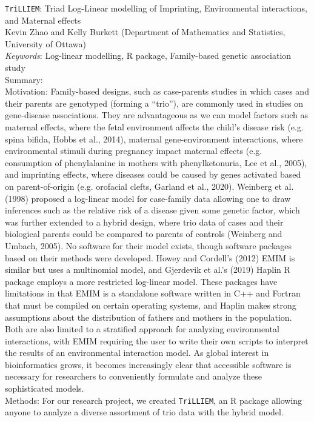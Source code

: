 \documentclass[11pt]{article}
\begin{document}
\singlespacing
\noindent \texttt{TriLLIEM}: Triad Log-Linear modelling of Imprinting, Environmental interactions, and Maternal effects\\
Kevin Zhao and Kelly Burkett (Department of Mathematics and Statistics, University of Ottawa)\\
\emph{Keywords}: Log-linear modelling, R package, Family-based genetic association study\\
Summary:\\
Motivation:
Family-based designs, such as case-parents studies in which cases and their parents are genotyped (forming a ``trio''), are commonly used in studies on gene-disease associations.
They are advantageous as we can model factors such as maternal effects, where the fetal environment affects the child's disease risk (e.g. spina bifida, Hobbs et al., 2014), maternal gene-environment interactions, where environmental stimuli during pregnancy impact maternal effects (e.g. consumption of phenylalanine in mothers with phenylketonuria, Lee et al., 2005), and imprinting effects, where diseases could be caused by genes activated based on parent-of-origin (e.g. orofacial clefts, Garland et al., 2020).
Weinberg et al. (1998) proposed a log-linear model for case-family data allowing one to draw inferences such as the relative risk of a disease given some genetic factor, which was further extended to a hybrid design, where trio data of cases and their biological parents could be compared to parents of controls (Weinberg and Umbach, 2005).
No software for their model exists, though software packages based on their methods were developed.
Howey and Cordell's (2012) EMIM is similar but uses a multinomial model, and Gjerdevik et al.'s (2019) Haplin R package employs a more restricted log-linear model.
These packages have limitations in that EMIM is a standalone software written in C++ and Fortran that must be compiled on certain operating systems, and Haplin makes strong assumptions about the distribution of fathers and mothers in the population.
Both are also limited to a stratified approach for analyzing environmental interactions, with EMIM requiring the user to write their own scripts to interpret the results of an environmental interaction model.
As global interest in bioinformatics grows, it becomes increasingly clear that accessible software is necessary for researchers to conveniently formulate and analyze these sophisticated models.
\\
Methods:
For our research project, we created \texttt{TriLLIEM}, an R package allowing anyone to analyze a diverse assortment of trio data with the hybrid model.
\end{document}
